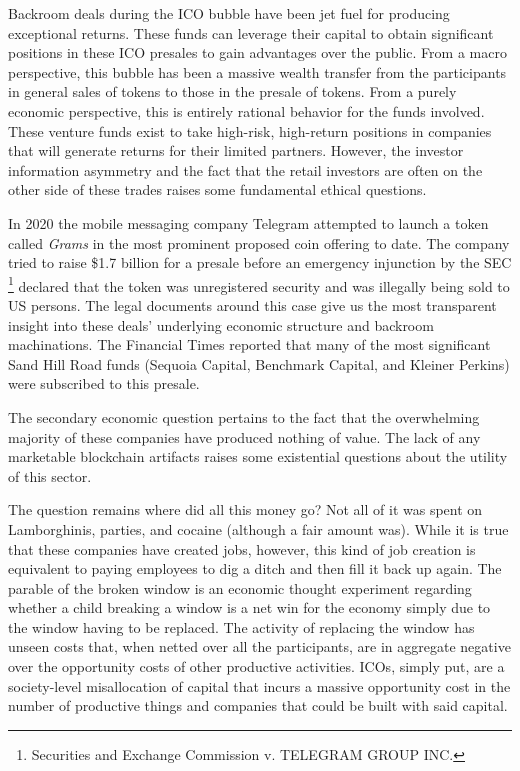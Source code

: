 Backroom deals during the ICO bubble have been jet fuel for producing
exceptional returns. These funds can leverage their capital to obtain
significant positions in these ICO presales to gain advantages over the public.
From a macro perspective, this bubble has been a massive wealth transfer from
the participants in general sales of tokens to those in the presale of tokens.
From a purely economic perspective, this is entirely rational behavior for the
funds involved. These venture funds exist to take high-risk, high-return
positions in companies that will generate returns for their limited partners.
However, the investor information asymmetry and the fact that the retail
investors are often on the other side of these trades raises some fundamental
ethical questions.

In 2020 the mobile messaging company Telegram attempted to launch a token called
\textit{Grams} in the most prominent proposed coin offering to date. The company
tried to raise \$1.7 billion for a presale before an emergency injunction by the
SEC \footnote{Securities and Exchange Commission v. TELEGRAM GROUP INC.}
declared that the token was unregistered security and was illegally being sold
to US persons. \cite{noauthor_securities_2020-1} The legal documents around this
case give us the most transparent insight into these deals' underlying economic
structure and backroom machinations. The Financial Times reported that many of
the most significant Sand Hill Road funds (Sequoia Capital, Benchmark Capital,
and Kleiner Perkins) were subscribed to this presale.
\cite{cornish_silicon_2018}


The secondary economic question pertains to the fact that the overwhelming
majority of these companies have produced nothing of value. The lack of any
marketable blockchain artifacts raises some existential questions about the
utility of this sector.

The question remains where did all this money go? Not all of it was spent on
Lamborghinis, parties, and cocaine (although a fair amount was). While it is
true that these companies have created jobs, however, this kind of job creation
is equivalent to paying employees to dig a ditch and then fill it back up again.
The parable of the broken window is an economic thought experiment regarding
whether a child breaking a window is a net win for the economy simply due to the
window having to be replaced. The activity of replacing the window has unseen
costs that, when netted over all the participants, are in aggregate negative
over the opportunity costs of other productive activities. ICOs, simply put, are
a society-level misallocation of capital that incurs a massive opportunity cost
in the number of productive things and companies that could be built with said
capital.

